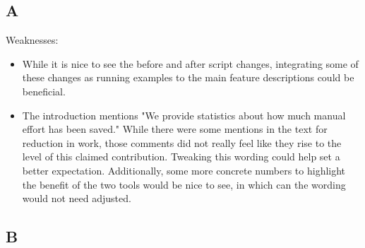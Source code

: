 \documentclass[10pt,conference]{IEEEtran}
\begin{document}
\subsection{A}
Weaknesses:
\begin{itemize}
    \item While it is nice to see the before and after script changes, integrating some of these changes as running examples to the main feature descriptions could be beneficial.
    \item
The introduction mentions "We provide statistics about how much manual effort has been saved." While there were some mentions in the text for reduction in work, those comments did not really feel like they rise to the level of this claimed contribution. 
Tweaking this wording could help set a better expectation. Additionally, some more concrete numbers to highlight the benefit of the two tools would be nice to see, in which can the wording would not need adjusted.

\end{itemize}


\subsection{B}
\end{document}
